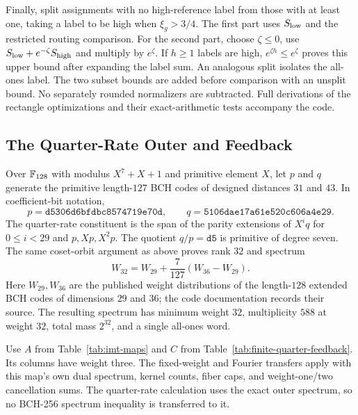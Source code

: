 Finally, split assignments with no high-reference label from those with
at least one, taking a label to be high when $\xi_g>3/4$.
The first part uses $S_{\rm low}$ and the restricted routing comparison.
For the second part, choose $\zeta\le0$, use
$S_{\rm low}+e^{-\zeta}S_{\rm high}$ and multiply by $e^\zeta$.
If $h\ge1$ labels are high, $e^{\zeta h}\le e^\zeta$ proves this upper
bound after expanding the label sum. An analogous split isolates the
all-ones label. The two subset bounds are added before comparison with an
unsplit bound. No separately rounded normalizers are subtracted.
Full derivations of the rectangle optimizations and their exact-arithmetic
tests accompany the code\repositorycite.

\subsection{The Quarter-Rate Outer and Feedback}
\label{app:finite-quarter-definition}

Over $\mathbb F_{128}$ with modulus $X^7+X+1$ and primitive element $X$, let
$p$ and $q$ generate the primitive length-$127$ BCH codes of designed
distances $31$ and $43$. In coefficient-bit notation,
\[
 p=\texttt{d5306d6bfdbc8574719e70d},\qquad
 q=\texttt{5106dae17a61e520c606a4e29}.
\]
The quarter-rate constituent is the span of the parity extensions of
$X^iq$ for $0\le i<29$ and $p,Xp,X^2p$.
The quotient $q/p=\texttt{d5}$ is primitive of degree seven. The same
coset-orbit argument as above proves rank $32$ and spectrum
\[
 W_{32}=W_{29}+\frac7{127}(W_{36}-W_{29}).
\]
Here $W_{29},W_{36}$ are the published weight distributions of the
length-$128$ extended BCH codes of dimensions $29$ and $36$; the code
documentation records their source\repositorycite.
The resulting spectrum has minimum weight $32$, multiplicity $588$ at
weight $32$, total mass $2^{32}$, and a single all-ones word.

Use $A$ from Table~\ref{tab:imt-maps} and $C$ from
Table~\ref{tab:finite-quarter-feedback}. Its columns have weight three.
The fixed-weight and Fourier transfers apply with this map's own dual
spectrum, kernel counts, fiber caps, and weight-one/two cancellation sums.
The quarter-rate calculation uses the exact outer spectrum, so no BCH-256
spectrum inequality is transferred to it.

